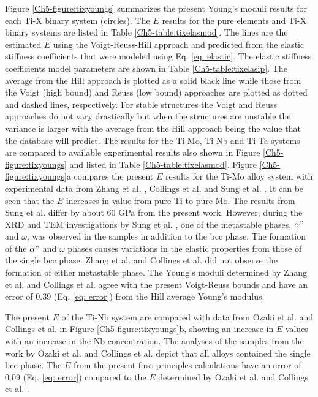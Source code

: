 Figure \ref{Ch5-figure:tixyoungs} summarizes the present Young's moduli results for each Ti-X binary system (circles). The $E$ results for the pure elements and Ti-X binary systems are listed in Table \ref{Ch5-table:tixelasmod}. The lines are the estimated $E$ using the Voigt-Reuss-Hill approach and predicted from the elastic stiffness coefficients that were modeled using Eq. \ref{eq: elastic}. The elastic stiffness coefficients model parameters are shown in Table \ref{Ch5-table:tixelasip}. The average from the Hill approach is plotted as a solid black line while those from the Voigt (high bound) and Reuss (low bound) approaches are plotted as dotted and dashed lines, respectively. For stable structures the Voigt and Reuss approaches do not vary drastically but when the structures are unstable the variance is larger with the average from the Hill approach being the value that the database will predict. The results for the Ti-Mo, Ti-Nb and Ti-Ta systems are compared to available experimental results \cite{Zhang2015,Boyer1994,Sung2015,Ozaki2004,Fedotov1985,Zhou2009a,Zhou2004a} also shown in Figure \ref{Ch5-figure:tixyoungs} and listed in Table \ref{Ch5-table:tixelasmod}. Figure \ref{Ch5-figure:tixyoungs}a compares the present $E$ results for the Ti-Mo alloy system with experimental data from Zhang et al. \cite{Zhang2015}, Collings et al. \cite{Boyer1994} and Sung et al. \cite{Sung2015}. It can be seen that the $E$ increases in value from pure Ti to pure Mo. The results from Sung et al. \cite{Sung2015} differ by about 60 GPa from the present work. However, during the XRD and TEM investigations by Sung et al. \cite{Sung2015}, one of the metastable phases, $\alpha"$ and $\omega$, was observed in the samples in addition to the bcc phase. The formation of the $\alpha"$ and $\omega$ phases causes variations in the elastic properties from those of the single bcc phase. Zhang et al. \cite{Zhang2015} and Collings et al. \cite{Boyer1994} did not observe the formation of either metastable phase. The Young's moduli determined by Zhang et al. \cite{Zhang2015} and Collings et al. \cite{Boyer1994} agree with the present Voigt-Reuss bounds and have an error of 0.39 (Eq. \ref{eq: error}) from the Hill average Young's modulus. 

The present $E$ of the Ti-Nb system are compared with data from Ozaki et al. \cite{Ozaki2004} and Collings et al. \cite{Boyer1994} in Figure \ref{Ch5-figure:tixyoungs}b, showing an increase in $E$ values with an increase in the Nb concentration. The analyses of the samples from the work by Ozaki et al. \cite{Ozaki2004} and Collings et al. \cite{Boyer1994} depict that all alloys contained the single bcc phase. The $E$ from the present first-principles calculations have an error of 0.09 (Eq. \ref{eq: error}) compared to the $E$ determined by Ozaki et al. \cite{Ozaki2004} and Collings et al. \cite{Boyer1994}. 

